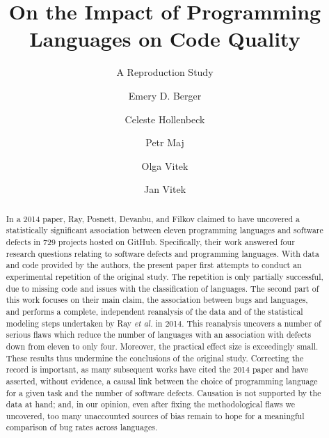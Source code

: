 \documentclass[acmsmall]{acmart}
\newcommand{\gh}{{GitHub}\xspace}
\newcommand{\ea}{\emph{et al.}\xspace}
\begin{document}






\title{On the Impact of Programming Languages on Code Quality}
\subtitle{A Reproduction Study}
  
\author{Emery D. Berger}

\author{Celeste Hollenbeck}

\author{Petr Maj}

\author{Olga Vitek}

\author{Jan Vitek}


\begin{abstract} 
In a 2014 paper, Ray, Posnett, Devanbu, and Filkov claimed to have
uncovered a statistically significant association between eleven programming
languages and software defects in 729 projects hosted on \gh.  Specifically,
their work answered four research questions relating to software defects and
programming languages. With data and code provided by the authors, the
present paper first attempts to conduct an experimental repetition of the original
study. The repetition is only partially successful, due to missing code and
issues with the classification of languages. The second part of this work
focuses on their main claim, the association between bugs and languages, and
performs a complete, independent reanalysis of the data and of the
statistical modeling steps undertaken by Ray \ea in 2014.  This reanalysis
uncovers a number of serious flaws which reduce the number of languages with
an association with defects down from eleven to only four. Moreover, the
practical effect size is exceedingly small. These results thus undermine the
conclusions of the original study. Correcting the record is important, as
many subsequent works have cited the 2014 paper and have asserted, without
evidence, a causal link between the choice of programming language for a
given task and the number of software defects. Causation is not supported by
the data at hand; and, in our opinion, even after fixing the methodological
flaws we uncovered, too many unaccounted sources of bias remain to hope for
a meaningful comparison of bug rates across languages.
%
\end{abstract}
\maketitle
\end{document}

